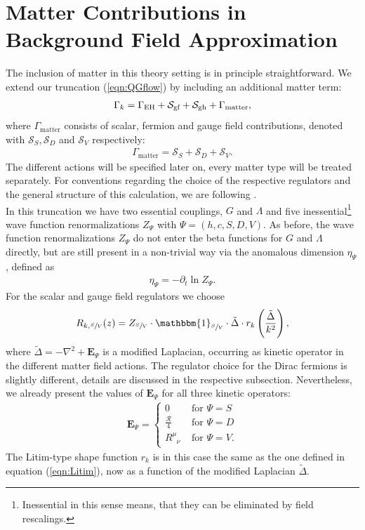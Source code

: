 \section{Matter Contributions in Background Field Approximation}
The inclusion of matter in this theory setting is in principle straightforward. We extend our truncation (\ref{eqn:QGflow}) by including an additional matter term: 
\begin{align}
	\Gamma_{k} = \Gamma_{\text{EH}} + \mathcal{S}_{\text{gf}}+ \mathcal{S}_{\text{gh}}+ \Gamma_{\text{matter}},
\end{align}
where $\Gamma_{\mathrm{matter}}$ consists of scalar, fermion and gauge field contributions, denoted with $\mathcal{S}_S, \mathcal{S}_D$ and $\mathcal{S}_V$ respectively:
\begin{align}
	\Gamma_{\text{matter}} = \mathcal{S}_S + \mathcal{S}_D + \mathcal{S}_V.
\end{align}
The different actions will be specified later on, every matter type will be treated separately. For conventions regarding the choice of the respective regulators and the general structure of this calculation, we are following \cite{DonaEichhornPercacci2013}. \\
In this truncation we have two essential couplings, $G$ and $\Lambda$ and five inessential\footnote{Inessential in this sense means, that they can be eliminated by field rescalings.} wave function renormalizations $Z_{\Psi}$ with $\Psi = (h,c,S,D,V)$. As before, the wave function renormalizations $Z_{\Psi}$ do not enter the beta functions for $G$ and $\Lambda$ directly, but are still present in a non-trivial way via the anomalous dimension $\eta_{\Psi}$, defined as
\begin{align}
	\eta_{\Psi} = -\partial_t \ln Z_{\Psi}.
\end{align}
For the scalar and gauge field regulators we choose
\begin{align}
	R_{k,\sfrac{S}{V}}(z) = Z_{\sfrac{S}{V}} \cdot \mathbbm{1}_{\sfrac{S}{V}} \cdot \tilde{\Delta}\cdot r_k\left(\frac{\tilde{\Delta}}{k^2}\right),
	\label{eqn:Rk_matter}
\end{align}
where $\tilde{\Delta}= -\nabla^2 + \mathbf{E}_{\Psi}$ is a modified Laplacian, occurring as kinetic operator in the different matter field actions. The regulator choice for the Dirac fermions is slightly different, details are discussed in the respective subsection. Nevertheless, we already present the values of $\mathbf{E}_{\Psi}$ for all three kinetic operators:
\begin{align}
	\mathbf{E}_{\Psi} =  \left\{\begin{array}{ll}{0} & {\text { for } \Psi = S} \\[5pt] {\frac{\mathcal{R}}{4}} & {\text { for } \Psi = D}\\[5pt]  {R^{\mu}_{\phantom{\mu}\nu}} & {\text { for } \Psi = V.}\end{array}\right.
\end{align}
The Litim-type shape function $r_k$ is in this case the same as the one defined in equation (\ref{eqn:Litim}), now as a function of the modified Laplacian $\tilde{\Delta}$.

